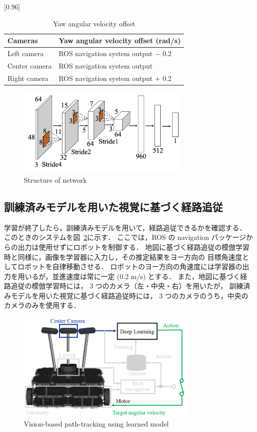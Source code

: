 \documentclass{jarticle}
\renewcommand{\figurename}{図~}
\newcommand{\figref}[1]{\figurename\ref{#1}}
\begin{document}
\begin{table}[h!]
  \centering
  \caption{Yaw angular velocity offset}
  \label{table:1}
    \scalebox{0.96}[0.96]{
    \begin{tabular}{|l||l|}
      \hline
      Cameras & Yaw angular velocity offset (rad/s)\\
      \hline\hline
      Left camera & ROS navigation system output $-$ 0.2\\
      \hline
      Center camera & ROS navigation system output\\
      \hline
      Right camera & ROS navigation system output $+$ 0.2\\
      \hline
    \end{tabular} }
\end{table}

\vspace*{1zh}

\begin{figure}[h!]
  \centering
   \includegraphics[height=43mm]{pdf/network.pdf}
   \caption{Structure of network}
   \label{fig:2}
\end{figure}




\subsection{訓練済みモデルを用いた視覚に基づく経路追従}
学習が終了したら，訓練済みモデルを用いて，経路追従できるかを確認する．
このときのシステムを\figref{fig:4}に示す．
ここでは，ROS の navigation パッケージからの出力は使用せずにロボットを制御する．
地図に基づく経路追従の模倣学習時と同様に，画像を学習器に入力し，その推定結果をヨー方向の
目標角速度としてロボットを自律移動させる．
ロボットのヨー方向の角速度には学習器の出力を用いるが，並進速度は常に一定 (0.2 m/s) とする．
また，地図に基づく経路追従の模倣学習時には， 3 つのカメラ（左・中央・右）を用いたが，
訓練済みモデルを用いた視覚に基づく経路追従時には， 3 つのカメラのうち，中央のカメラのみを使用する．

\begin{figure}[h!]
  \centering
   \includegraphics[height=53mm]{./png/afterlearn.png}
   \caption{Vision-based path-tracking using learned model}
   \label{fig:4}
\end{figure}
\end{document}
